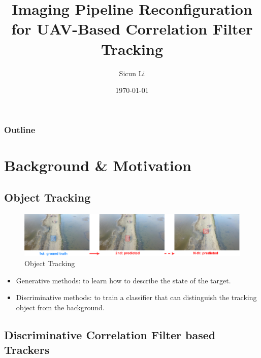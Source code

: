 \documentclass{beamer}
\author{Sicun Li}
\title{Imaging Pipeline Reconfiguration for UAV-Based Correlation Filter Tracking}
\institute{School of Microelectronics}
\date{\today}
\begin{document}
\begin{frame}
    \titlepage
\end{frame}

\begin{frame}
    \frametitle{Outline}
    \tableofcontents[sectionstyle=show,subsectionstyle=show/shaded/hide,subsubsectionstyle=show/shaded/hide]
\end{frame}

\section{Background \& Motivation}

\subsection{Object Tracking}

\begin{frame}
    \begin{figure}[htpb]
        \begin{center}
            \includegraphics[width=1.0\linewidth]{fig/obt.pdf}
            \caption{Object Tracking}
        \end{center}
    \end{figure}
\end{frame}

\begin{frame}
    \begin{itemize}[<+-| alert@+>]
        \item Generative methods: to learn how to describe the state of the target.
        \item Discriminative methods: to train a classifier that can distinguish the tracking object from the background.
    \end{itemize}
\end{frame}

\subsection{Discriminative Correlation Filter based Trackers}
\end{document}
